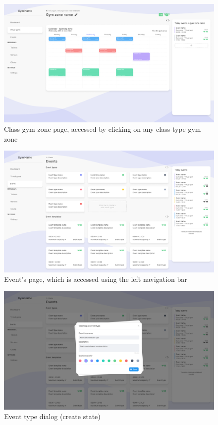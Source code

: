 \documentclass[a4paper, 12pt, oneside]{book}
\begin{document}
\begin{figure}[h!]
	\centering
	\includegraphics[width=\textwidth]{assets/ui/ClassGymZone.png}
	\caption{Class gym zone page, accessed by clicking on any class-type gym zone}
\end{figure}
\begin{figure}[h!]
	\centering
	\includegraphics[width=\textwidth]{assets/ui/Events.png}
	\caption{Event's page, which is accessed using the left navigation bar}
\end{figure}
\begin{figure}[h!]
	\centering
	\includegraphics[width=\textwidth]{assets/ui/EventTypeCreate.png}
	\caption{Event type dialog (create state)}
\end{figure}
\end{document}
